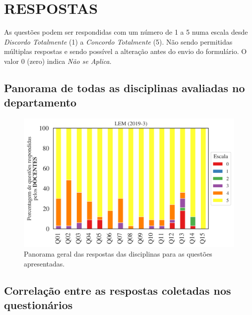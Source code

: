 \documentclass[a4paper,10pt]{article}
\begin{document}
\section{RESPOSTAS}
As questões podem ser respondidas com um número de 1 a 5 numa escala desde {\it Discordo Totalmente} (1) a {\it Concordo Totalmente} (5). Não sendo permitidas múltiplas respostas e sendo possível a alteração antes do envio do formulário. O valor 0 (zero) indica {\it Não se Aplica}.

\subsection{Panorama de todas as disciplinas avaliadas no departamento}
\begin{figure}[h]
\centering
\includegraphics[width=0.85\linewidth]{analise_geral_departamento_LEM_docentes.png}
\caption{\label{fig:analise_geral_departamento}            Panorama geral das respostas das disciplinas para as questões apresentadas.}
\end{figure}
\subsection{Correlação entre as respostas coletadas nos questionários}
\end{document}

